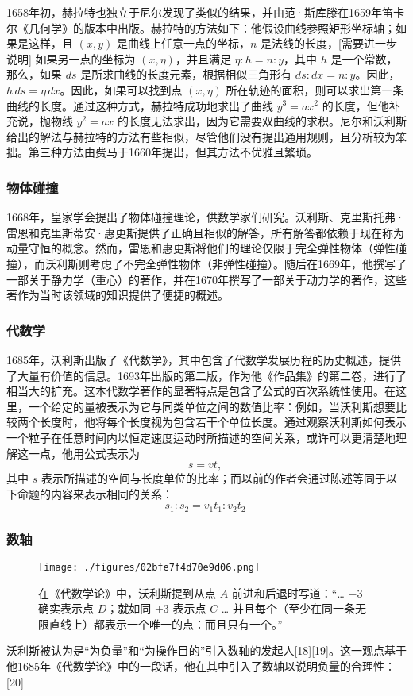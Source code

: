 1658年初，赫拉特也独立于尼尔发现了类似的结果，并由范·斯库滕在1659年笛卡尔《几何学》的版本中出版。赫拉特的方法如下：他假设曲线参照矩形坐标轴；如果是这样，且 \((x, y)\) 是曲线上任意一点的坐标，\(n\) 是法线的长度，[需要进一步说明] 如果另一点的坐标为 \((x, \eta)\)，并且满足 \(\eta : h = n : y\)，其中 \(h\) 是一个常数，那么，如果 \(ds\) 是所求曲线的长度元素，根据相似三角形有 \(ds : dx = n : y\)。因此，\(h \, ds = \eta \, dx\)。因此，如果可以找到点 \((x, \eta)\) 所在轨迹的面积，则可以求出第一条曲线的长度。通过这种方式，赫拉特成功地求出了曲线 \(y^3 = ax^2\) 的长度，但他补充说，抛物线 \(y^2 = ax\) 的长度无法求出，因为它需要双曲线的求积。尼尔和沃利斯给出的解法与赫拉特的方法有些相似，尽管他们没有提出通用规则，且分析较为笨拙。第三种方法由费马于1660年提出，但其方法不优雅且繁琐。
\subsubsection{物体碰撞}
1668年，皇家学会提出了物体碰撞理论，供数学家们研究。沃利斯、克里斯托弗·雷恩和克里斯蒂安·惠更斯提供了正确且相似的解答，所有解答都依赖于现在称为动量守恒的概念。然而，雷恩和惠更斯将他们的理论仅限于完全弹性物体（弹性碰撞），而沃利斯则考虑了不完全弹性物体（非弹性碰撞）。随后在1669年，他撰写了一部关于静力学（重心）的著作，并在1670年撰写了一部关于动力学的著作，这些著作为当时该领域的知识提供了便捷的概述。
\subsubsection{代数学}
1685年，沃利斯出版了《代数学》，其中包含了代数学发展历程的历史概述，提供了大量有价值的信息。1693年出版的第二版，作为他《作品集》的第二卷，进行了相当大的扩充。这本代数学著作的显著特点是包含了公式的首次系统性使用。在这里，一个给定的量被表示为它与同类单位之间的数值比率：例如，当沃利斯想要比较两个长度时，他将每个长度视为包含若干个单位长度。通过观察沃利斯如何表示一个粒子在任意时间内以恒定速度运动时所描述的空间关系，或许可以更清楚地理解这一点，他用公式表示为
\[
s = vt,~
\]
其中 \(s\) 表示所描述的空间与长度单位的比率；而以前的作者会通过陈述等同于以下命题的内容来表示相同的关系：
\[
s_1 : s_2 = v_1 t_1 : v_2 t_2~
\]
\subsubsection{数轴}
\begin{figure}[ht]
\centering
\texttt{[image: ./figures/02bfe7f4d70e9d06.png]}
\caption{在《代数学论》中，沃利斯提到从点 \(A\) 前进和后退时写道：“… \(-3\) 确实表示点 \(D\)；就如同 \(+3\) 表示点 \(C\) … 并且每个（至少在同一条无限直线上）都表示一个唯一的点：而且只有一个。”} \label{fig_YHALS_3}
\end{figure}
沃利斯被认为是“为负量”和“为操作目的”引入数轴的发起人[18][19]。这一观点基于他1685年《代数学论》中的一段话，他在其中引入了数轴以说明负量的合理性：[20]

